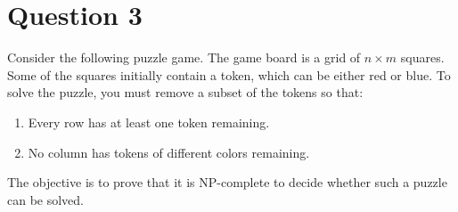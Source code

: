 \documentclass{article}
\begin{document}
\section{Question 3}


Consider the following puzzle game. The game board is a grid of \(n \times m\) squares. Some of the squares initially contain a token, which can be either red or blue. To solve the puzzle, you must remove a subset of the tokens so that:
\begin{enumerate}
    \item Every row has at least one token remaining.
    \item No column has tokens of different colors remaining.
\end{enumerate}

The objective is to prove that it is NP-complete to decide whether such a puzzle can be solved.
\end{document}
